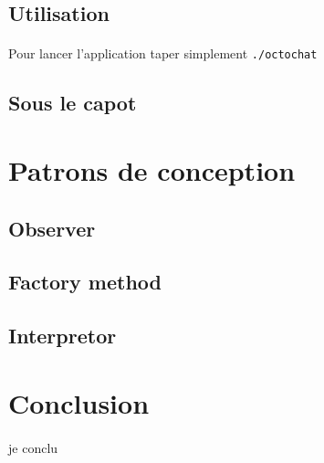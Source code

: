 \documentclass[a4paper]{article}
\begin{document}
		\subsection{Utilisation}
			\paragraph{}{
			Pour lancer l'application taper simplement \verb|./octochat|
			}
		
		\subsection{Sous le capot}
		
		\newpage
		
	\section{Patrons de conception}
		\subsection{Observer}
		\subsection{Factory method}
		\subsection{Interpretor}
	
	\newpage
	
	\section*{Conclusion}
		\paragraph{}{je conclu}
		
\end{document}
